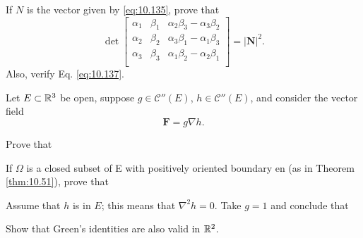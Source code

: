 \begin{myexercise}
    \label{ex:10.30}
    If $N$ is the vector given by \eqref{eq:10.135}, 
    prove that
    \begin{equation*}
        \det 
        \begin{bmatrix}
            \alpha_1 & \beta_1 & \alpha_2 \beta_3 - \alpha_3 \beta_2 \\
            \alpha_2 & \beta_2 & \alpha_3 \beta_1 - \alpha_1 \beta_3 \\
            \alpha_3 & \beta_3 & \alpha_1 \beta_2 - \alpha_2 \beta_1 \\
        \end{bmatrix} = 
        \left| \mathbf{N} \right|^2 .
    \end{equation*}
    Also, verify Eq. \eqref{eq:10.137}.
\end{myexercise}


\begin{myexercise}
    \label{ex:10.31}
    Let $E \subset {\protect\mathbb R}^3$ be open, 
    suppose $g \in  \mathscr{C}''(E)$, $h \in \mathscr{C}''(E)$, and consider the vector field
    \begin{equation*}
        \mathbf{F} = g \nabla h .
    \end{equation*}
    \begin{asparaenum}[(a)]
        \item Prove that 
        \item If $\Omega$ is a closed subset of E with positively oriented boundary en (as in Theorem \ref{thm:10.51}), prove that
        \item Assume that $h$ is  in $E$; this means that $\nabla^2 h = 0$. Take $g = 1$ and conclude that
        \item Show that Green's identities are also valid in ${\protect\mathbb R}^2$.
    \end{asparaenum}
\end{myexercise}


\begin{myexercise}
    \label{ex:10.32}
\end{myexercise}


